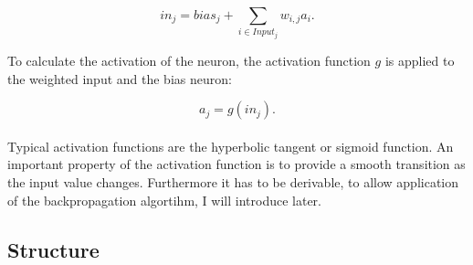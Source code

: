 \begin{equation*}
in_j = bias_j + \sum\limits_{i \in Input_j} w_{i,j} a_i.
\end{equation*}

To calculate the activation of the neuron, the activation function $g$ is applied to the weighted input and the bias neuron:

\begin{equation*}
a_j = g(in_j).
\end{equation*}
\\
Typical activation functions are the hyperbolic tangent or sigmoid function. An important property of the activation function is to provide a smooth transition as the input value changes. Furthermore it has to be derivable, to allow application of the backpropagation algortihm, I will introduce later. 


\subsection{Structure} 

